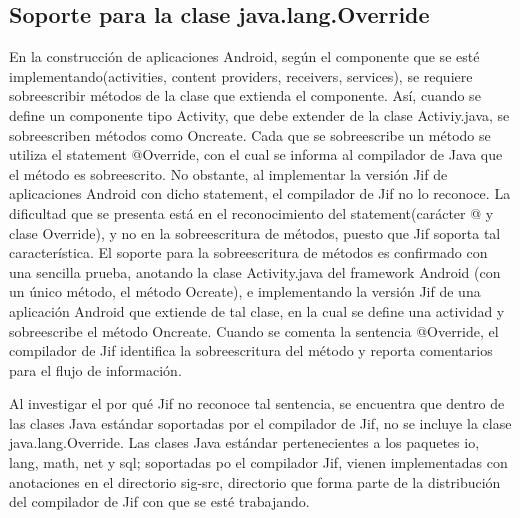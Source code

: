 \subsection{Soporte para la clase java.lang.Override}
\label{sub:override}
En la construcción de aplicaciones Android, según el componente que se esté
implementando(activities, content providers, receivers, services), se requiere
sobreescribir métodos de la clase que extienda el componente. Así, cuando se
define un componente tipo Activity, que debe extender de la clase Activiy.java, 
se sobreescriben métodos como Oncreate. Cada que se sobreescribe
un método se utiliza el statement @Override, con el cual se informa al
compilador de Java que el método es sobreescrito. No obstante, al implementar la
versión Jif de aplicaciones Android con dicho statement, el compilador de Jif
no lo reconoce. La dificultad que se presenta está en el reconocimiento del
statement(carácter @ y clase Override), y no en la sobreescritura de métodos,
puesto que Jif soporta tal característica.\newline 
El soporte para la sobreescritura de
métodos es confirmado con una sencilla prueba, anotando la clase Activity.java
del framework Android (con un único método, el método Ocreate), e implementando
la versión Jif de una aplicación Android que extiende de tal clase, en la cual
se define una actividad y sobreescribe el método Oncreate.
Cuando se comenta la sentencia @Override, el compilador de Jif identifica la
sobreescritura del método y reporta comentarios para el flujo de información.

Al investigar el por qué Jif no reconoce tal sentencia, se encuentra que dentro
de las clases Java estándar soportadas por el compilador de Jif, no se incluye
la clase java.lang.Override.\newline 
Las clases Java estándar pertenecientes a los paquetes io, lang, math, net y
sql; soportadas po el compilador Jif, vienen implementadas con anotaciones en el
directorio sig-src, directorio que forma parte de la distribución del compilador
de Jif con que se esté trabajando.

